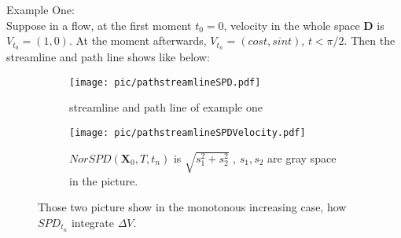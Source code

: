 \documentclass[
     11pt,         %
     a4paper,      %
     oneside,
     ]{article}
\newcommand{\vect}[1]{\boldsymbol{#1}}
\begin{document}
Example One:\\
Suppose in a flow, at the first moment $t_{0}=0$, velocity in the whole space $\vect{D}$ is $V_{t_{0}}=(1,0)$.
At the moment afterwards, $V_{t_{n}}=(cos t, sin t)$, $t<\pi/2$. Then the streamline and path line shows like below:\\
\begin{figure}[H]
	\begin{subfigure}{0.8\textwidth}
		\centering
	 	\texttt{[image: pic/pathstreamlineSPD.pdf]}
	 	\caption{streamline and path line of example one}
	 	\label{fig:pathstreamlineSPD}
	\end{subfigure}
	\begin{subfigure}{0.8\textwidth}
	 	\centering
	 	\texttt{[image: pic/pathstreamlineSPDVelocity.pdf]}
		\caption{$NorSPD(\vect{X}_{0},T,t_{n})$ is $\sqrt{s_{1}^{2}+s_{2}^{2}}$ , $s_{1},s_{2}$ are gray space in the picture.}
		\label{fig:SPDWithVelocity}
	\end{subfigure}
	\caption{Those two picture show in the monotonous increasing case, how $SPD_{t_{n}}$ integrate $\Delta V$.}
	\label{fig:SPDStreamPathlineWithVelocity}
 \end{figure} 
 
\end{document}
